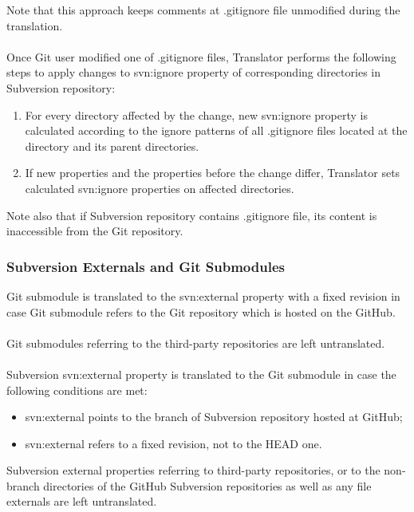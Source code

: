 Note that this approach keeps comments at .gitignore file unmodified during the translation.
\\\\
Once Git user modified one of .gitignore files, Translator performs the following steps to apply changes to svn:ignore property of corresponding directories in Subversion repository:

\begin{enumerate}
\compactlist
\item For every directory affected by the change, new svn:ignore property is calculated according to the ignore patterns of all .gitignore files located at the directory and its parent directories.\\
\item If new properties and the properties before the change differ, Translator sets calculated svn:ignore properties on affected directories.\\
\end{enumerate}

Note also that if Subversion repository contains .gitignore file, its content is inaccessible from the Git repository.

\subsubsection{Subversion Externals and Git Submodules}
\label{section_externals_and_submodules}
Git submodule is translated to the svn:external property with a fixed revision in case Git submodule refers to the Git repository
which is hosted on the GitHub.
\\\\
Git submodules referring to the third-party repositories are left untranslated.
\\\\
Subversion svn:external property is translated to the Git submodule in case the following conditions are met:
\begin{itemize}
\item svn:external points to the branch of Subversion repository hosted at GitHub;
\item svn:external refers to a fixed revision, not to the HEAD one.
\end{itemize}
Subversion external properties referring to third-party repositories, or to the non-branch directories of the GitHub Subversion repositories as
well as any file externals are left untranslated.
